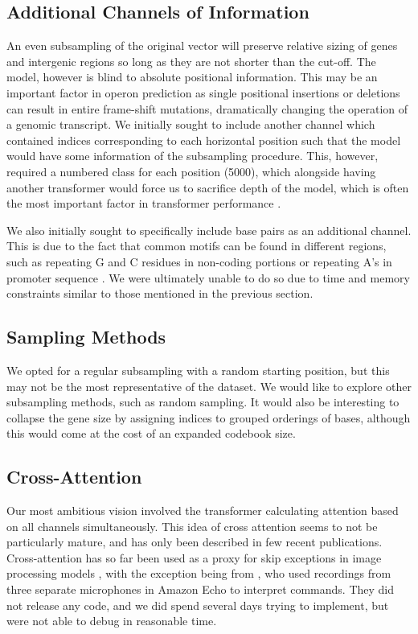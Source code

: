 \documentclass{article}
\begin{document}
\subsection{Additional Channels of Information}

An even subsampling of the original vector will preserve relative sizing of genes and intergenic regions so long as they are not shorter than the cut-off. The model, however is blind to absolute positional information. This may be an important factor in operon prediction as single positional insertions or deletions can result in entire frame-shift mutations, dramatically changing the operation of a genomic transcript. We initially sought to include another channel which contained indices corresponding to each horizontal position such that the model would have some information of the subsampling procedure. This, however, required a numbered class for each position (5000), which alongside having another transformer would force us to sacrifice depth of the model, which is often the most important factor in transformer performance \cite{fan_reducing_2019}. 

We also initially sought to specifically include base pairs as an additional channel. This is due to the fact that common motifs can be found in different regions, such as repeating G and C residues in non-coding portions or repeating A's in promoter sequence \cite{noauthor_frontiers_nodate}. We were ultimately unable to do so due to time and memory constraints similar to those mentioned in the previous section.

\subsection{Sampling Methods}

We opted for a regular subsampling with a random starting position, but this may not be the most representative of the dataset. We would like to explore other subsampling methods, such as random sampling. It would also be interesting to collapse the gene size by assigning indices to grouped orderings of bases, although this would come at the cost of an expanded codebook size. 

\subsection{Cross-Attention}

Our most ambitious vision involved the transformer calculating attention based on all channels simultaneously. This idea of cross attention seems to not be particularly mature, and has only been described in few recent publications. Cross-attention has so far been used as a proxy for skip exceptions in image processing models \cite{sheng_cross-attention_2022, petit_u-net_2021}, with the exception being from \citet{chang_end--end_2021}, who used recordings from three separate microphones in Amazon Echo to interpret commands. They did not release any code, and we did spend several days trying to implement, but were not able to debug in reasonable time.
\end{document}
